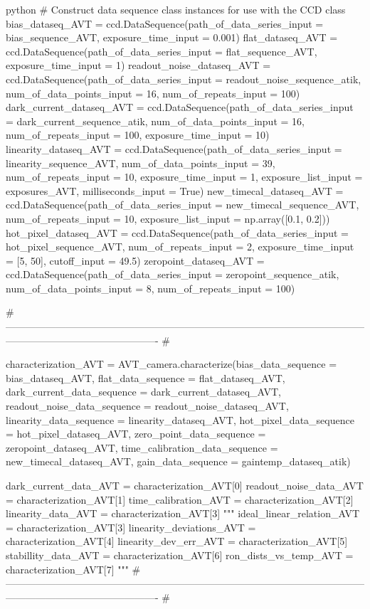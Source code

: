 \documentclass[../main.tex]{subfiles}
\begin{document}
\begin{mintedbox}{python}
# Construct data sequence class instances for use with the CCD class
bias_dataseq_AVT  =  ccd.DataSequence(path_of_data_series_input  =  bias_sequence_AVT,
exposure_time_input  =  0.001)
flat_dataseq_AVT  =  ccd.DataSequence(path_of_data_series_input  =  flat_sequence_AVT,
exposure_time_input  =  1)
readout_noise_dataseq_AVT  =  ccd.DataSequence(path_of_data_series_input  =  readout_noise_sequence_atik,
num_of_data_points_input  =  16,
num_of_repeats_input  =  100)
dark_current_dataseq_AVT  =  ccd.DataSequence(path_of_data_series_input  =  dark_current_sequence_atik,
num_of_data_points_input  =  16,
num_of_repeats_input  =  100,
exposure_time_input  =  10)
linearity_dataseq_AVT  =  ccd.DataSequence(path_of_data_series_input  =  linearity_sequence_AVT,
num_of_data_points_input  =  39,
num_of_repeats_input  =  10,
exposure_time_input  =  1,
exposure_list_input  =  exposures_AVT,
milliseconds_input  =  True)
new_timecal_dataseq_AVT  =  ccd.DataSequence(path_of_data_series_input  =  new_timecal_sequence_AVT,
num_of_repeats_input  =  10,
exposure_list_input  =  np.array([0.1, 0.2]))
hot_pixel_dataseq_AVT  =  ccd.DataSequence(path_of_data_series_input  =  hot_pixel_sequence_AVT,
num_of_repeats_input  =  2,
exposure_time_input  =  [5, 50],
cutoff_input  =  49.5)
zeropoint_dataseq_AVT  =  ccd.DataSequence(path_of_data_series_input  =  zeropoint_sequence_atik,
num_of_data_points_input  =  8,
num_of_repeats_input  =  100)

# ---------------------------------------------------------------------------------------------------------------------------------------------------------- #

characterization_AVT  =  AVT_camera.characterize(bias_data_sequence  =  bias_dataseq_AVT,
flat_data_sequence  =  flat_dataseq_AVT,
dark_current_data_sequence  =  dark_current_dataseq_AVT,
readout_noise_data_sequence  =  readout_noise_dataseq_AVT,
linearity_data_sequence  =  linearity_dataseq_AVT,
hot_pixel_data_sequence  =  hot_pixel_dataseq_AVT,
zero_point_data_sequence  =  zeropoint_dataseq_AVT,
time_calibration_data_sequence  =  new_timecal_dataseq_AVT,
gain_data_sequence  =  gaintemp_dataseq_atik)

dark_current_data_AVT  =  characterization_AVT[0]
readout_noise_data_AVT  =  characterization_AVT[1]
time_calibration_AVT  =  characterization_AVT[2]
linearity_data_AVT  =  characterization_AVT[3]
"""
ideal_linear_relation_AVT    =    characterization_AVT[3]
linearity_deviations_AVT     =    characterization_AVT[4]
linearity_dev_err_AVT        =    characterization_AVT[5]
stabillity_data_AVT          =    characterization_AVT[6]
ron_dists_vs_temp_AVT        =    characterization_AVT[7]
"""
# ---------------------------------------------------------------------------------------------------------------------------------------------------------- #


\end{mintedbox}
\end{document}
